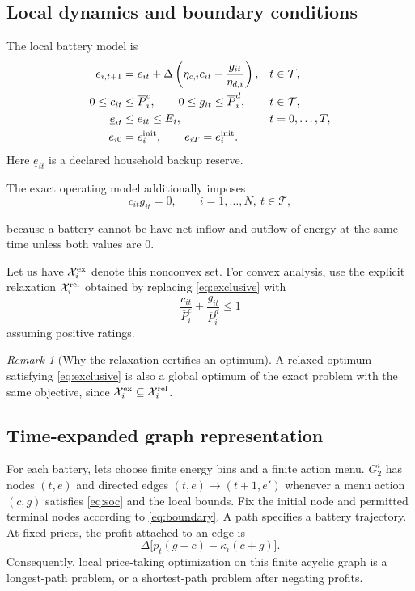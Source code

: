 \documentclass[11pt]{article}
\theoremstyle{remark}
\newtheorem{remark}[assumption]{Remark}
\newcommand{\X}{\mathcal X}
\newcommand{\T}{\mathcal T}
\begin{document}
\subsection{Local dynamics and boundary conditions}
The local battery model is
\begin{align}
 e_{i,t+1}&=e_{it}+\Delta\left(\eta_{c,i}c_{it}
                        -\frac{g_{it}}{\eta_{d,i}}\right),
 &&t\in\T, \label{eq:soc}\\
 0\le c_{it}&\le\overline P_i^c,\qquad
 0\le g_{it}\le\overline P_i^d, &&t\in\T, \label{eq:powerboxes}\\
 \underline e_{it}&\le e_{it}\le E_i, &&t=0,\ldots,T, \label{eq:energybounds}\\
 e_{i0}&=e_i^{\rm init},\qquad e_{iT}=e_i^{\rm init}.
 \label{eq:boundary}
\end{align}
Here $\underline e_{it}$ is a declared household backup reserve.

The exact operating model additionally imposes
\begin{equation}
 c_{it}g_{it}=0,\qquad i=1,\ldots,N,\ t\in\T,
 \label{eq:exclusive}
\end{equation}

because a battery cannot be have net inflow and outflow of energy at the same time unless both values are 0. 

Let us have $\X_i^{\rm ex}$ denote this  nonconvex set. For convex
analysis, use the explicit relaxation $\X_i^{\rm rel}$ obtained by replacing
\eqref{eq:exclusive} with
\begin{equation}
 \frac{c_{it}}{\overline P_i^c}
 +\frac{g_{it}}{\overline P_i^d}\le1
 \label{eq:moderelax}
\end{equation}
assuming positive ratings. 

\begin{remark}[Why the relaxation certifies an optimum]
A relaxed optimum satisfying \eqref{eq:exclusive} is also a global optimum
of the exact problem with the same objective, since
$\X_i^{\rm ex}\subseteq\X_i^{\rm rel}$. 
\end{remark}

\subsection{Time-expanded graph representation}
For each battery, lets choose finite energy bins and a finite action menu.
$G_2^i$ has nodes $(t,e)$ and directed edges
$(t,e)\to(t+1,e')$ whenever a menu action $(c,g)$ satisfies
\eqref{eq:soc} and the local bounds. Fix the initial node and permitted
terminal nodes according to \eqref{eq:boundary}. A path specifies a battery
trajectory. At fixed prices, the profit attached to an edge is
\begin{equation}
 \Delta\big[p_t(g-c)-\kappa_i(c+g)\big].
 \label{eq:edgeprofit}
\end{equation}
Consequently, local price-taking optimization on this finite acyclic graph
is a longest-path problem, or a shortest-path problem after negating profits.
\end{document}
